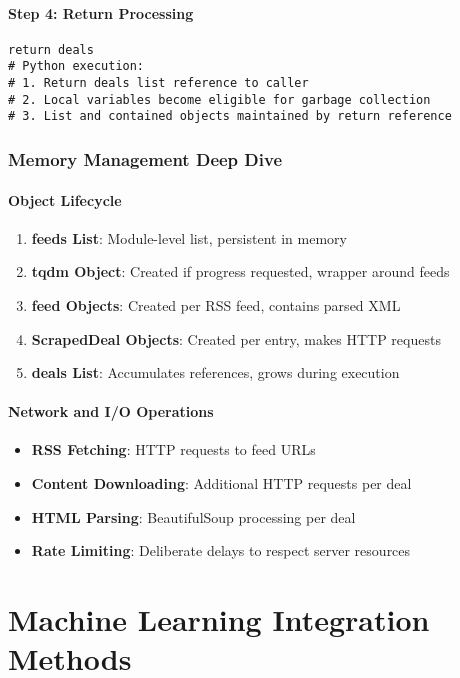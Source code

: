 \paragraph{Step 4: Return Processing}
\begin{lstlisting}[caption=Result Return]
return deals
# Python execution:
# 1. Return deals list reference to caller
# 2. Local variables become eligible for garbage collection
# 3. List and contained objects maintained by return reference
\end{lstlisting}

\subsubsection{Memory Management Deep Dive}

\paragraph{Object Lifecycle}
\begin{enumerate}
\item \textbf{feeds List}: Module-level list, persistent in memory
\item \textbf{tqdm Object}: Created if progress requested, wrapper around feeds
\item \textbf{feed Objects}: Created per RSS feed, contains parsed XML
\item \textbf{ScrapedDeal Objects}: Created per entry, makes HTTP requests
\item \textbf{deals List}: Accumulates references, grows during execution
\end{enumerate}

\paragraph{Network and I/O Operations}
\begin{itemize}
\item \textbf{RSS Fetching}: HTTP requests to feed URLs
\item \textbf{Content Downloading}: Additional HTTP requests per deal
\item \textbf{HTML Parsing}: BeautifulSoup processing per deal
\item \textbf{Rate Limiting}: Deliberate delays to respect server resources
\end{itemize}

\section{Machine Learning Integration Methods}

